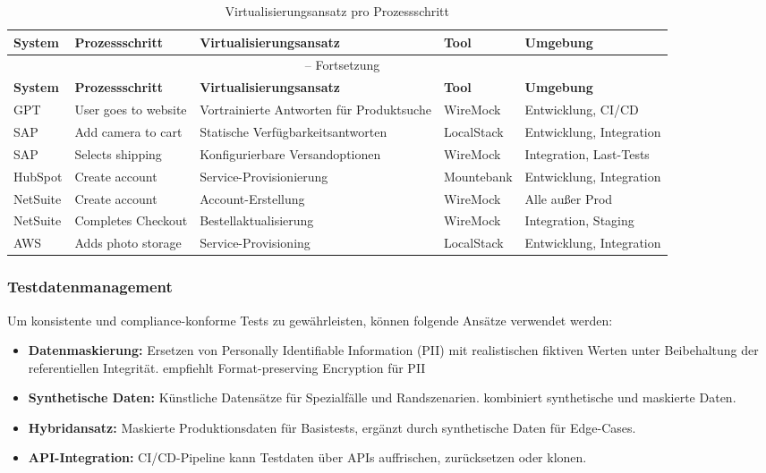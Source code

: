 \begin{longtable}{|p{2cm}|p{3cm}|p{4cm}|p{2cm}|p{3cm}|}
\caption{Virtualisierungsansatz pro Prozessschritt} \\ \hline
\textbf{System} & \textbf{Prozessschritt} & \textbf{Virtualisierungsansatz} & \textbf{Tool} & \textbf{Umgebung} \\ \hline
\endfirsthead

\multicolumn{5}{c}{\tablename\ \thetable{} -- Fortsetzung} \\ \hline
\textbf{System} & \textbf{Prozessschritt} & \textbf{Virtualisierungsansatz} & \textbf{Tool} & \textbf{Umgebung} \\ \hline
\endhead

GPT & User goes to website & Vortrainierte Antworten für Produktsuche & WireMock & Entwicklung, CI/CD \\ \hline
SAP & Add camera to cart & Statische Verfügbarkeitsantworten & LocalStack & Entwicklung, Integration \\ \hline
SAP & Selects shipping & Konfigurierbare Versandoptionen & WireMock & Integration, Last-Tests \\ \hline
HubSpot & Create account & Service-Provisionierung & Mountebank & Entwicklung, Integration \\ \hline
NetSuite & Create account & Account-Erstellung & WireMock & Alle außer Prod \\ \hline
NetSuite & Completes Checkout & Bestellaktualisierung & WireMock & Integration, Staging \\ \hline
AWS & Adds photo storage & Service-Provisioning & LocalStack & Entwicklung, Integration \\ \hline
\end{longtable}

\subsubsection{Testdatenmanagement}
Um konsistente und compliance-konforme Tests zu gewährleisten, können folgende Ansätze verwendet werden:

\begin{itemize}
    \item \textbf{Datenmaskierung:} Ersetzen von Personally Identifiable Information (PII) mit
    realistischen fiktiven Werten unter Beibehaltung der referentiellen Integrität. \citet{tricentis2024}
    empfiehlt Format-preserving Encryption für PII
    \item \textbf{Synthetische Daten:} Künstliche Datensätze für Spezialfälle und Randszenarien.
    \citet{browserstack2025} kombiniert synthetische und maskierte Daten.
    \item \textbf{Hybridansatz:} Maskierte Produktionsdaten für Basistests, ergänzt durch
    synthetische Daten für Edge-Cases.
    \item \textbf{API-Integration:} CI/CD-Pipeline kann Testdaten über APIs auffrischen,
    zurücksetzen oder klonen.
\end{itemize}

